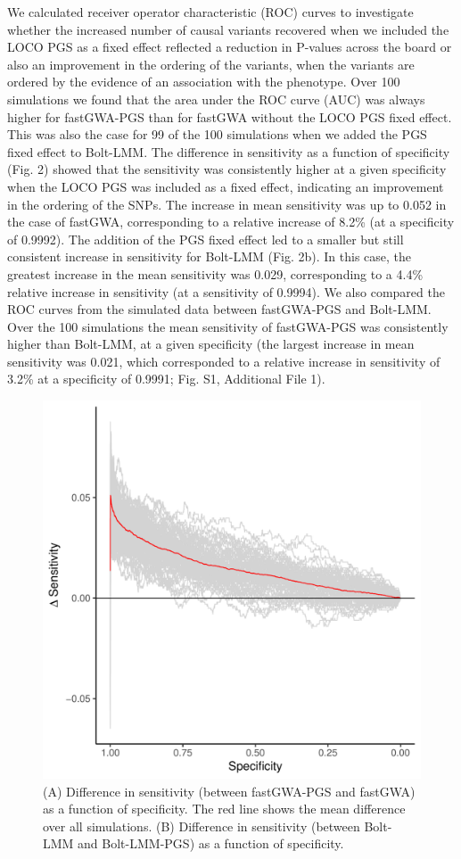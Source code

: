 \documentclass[fleqn,10pt]{wlscirep}
\begin{document}
\par We calculated receiver operator characteristic (ROC) curves to investigate whether the increased number of causal variants recovered when we included the LOCO PGS as a fixed effect reflected a reduction in P-values across the board or also an improvement in the ordering of the variants, when the variants are ordered by the evidence of an association with the phenotype. Over 100 simulations we found that the area under the ROC curve (AUC) was always higher for fastGWA-PGS than for fastGWA without the LOCO PGS fixed effect. This was also the case for 99 of the 100 simulations when we added the PGS fixed effect to Bolt-LMM. The difference in sensitivity as a function of specificity (Fig. 2) showed that the sensitivity was consistently higher at a given specificity when the LOCO PGS was included as a fixed effect, indicating an improvement in the ordering of the SNPs. The increase in mean sensitivity was up to 0.052 in the case of fastGWA, corresponding to a relative increase of 8.2\% (at a specificity of 0.9992). The addition of the PGS fixed effect led to a smaller but still consistent increase in sensitivity for Bolt-LMM (Fig. 2b). In this case, the greatest increase in the mean sensitivity was 0.029, corresponding to a 4.4\% relative increase in sensitivity (at a sensitivity of 0.9994). We also compared the ROC curves from the simulated data between fastGWA-PGS and Bolt-LMM. Over the 100 simulations the mean sensitivity of fastGWA-PGS was consistently higher than Bolt-LMM, at a given specificity (the largest increase in mean sensitivity was 0.021, which corresponded to a relative increase in sensitivity of 3.2\% at a specificity of 0.9991; Fig. S1, Additional File 1).
\par
\begin{figure}
\centering
\includegraphics[width=120mm]{images/Fig2}
\caption{ (A) Difference in sensitivity (between fastGWA-PGS and fastGWA) as a function of specificity. The red line shows the mean difference over all simulations. (B) Difference in sensitivity (between Bolt-LMM and Bolt-LMM-PGS) as a function of specificity.}
\label{fig:deltaROC curves}
\end{figure}
\par
\end{document}
